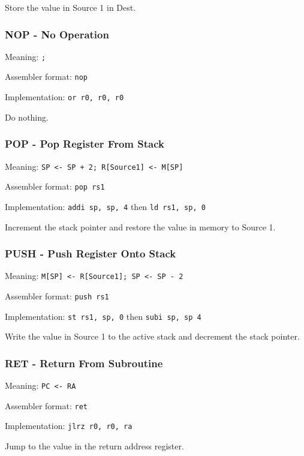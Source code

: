 \documentclass{article}
\begin{document}
Store the value in Source 1 in Dest.

\subsubsection{NOP - No Operation}
Meaning: \verb|;|

Assembler format: \verb|nop|

Implementation: \verb|or r0, r0, r0|

Do nothing.

\subsubsection{POP - Pop Register From Stack}
Meaning: \verb|SP <- SP + 2; R[Source1] <- M[SP]|

Assembler format: \verb|pop rs1|

Implementation: \verb|addi sp, sp, 4| then \verb|ld rs1, sp, 0|

Increment the stack pointer and restore the value in memory to Source 1.

\subsubsection{PUSH - Push Register Onto Stack}
Meaning: \verb|M[SP] <- R[Source1]; SP <- SP - 2|

Assembler format: \verb|push rs1|

Implementation: \verb|st rs1, sp, 0| then \verb|subi sp, sp 4|

Write the value in Source 1 to the active stack and decrement the stack pointer.

\subsubsection{RET - Return From Subroutine}
Meaning: \verb|PC <- RA|

Assembler format: \verb|ret|

Implementation: \verb|jlrz r0, r0, ra|

Jump to the value in the return address register.
\end{document}
